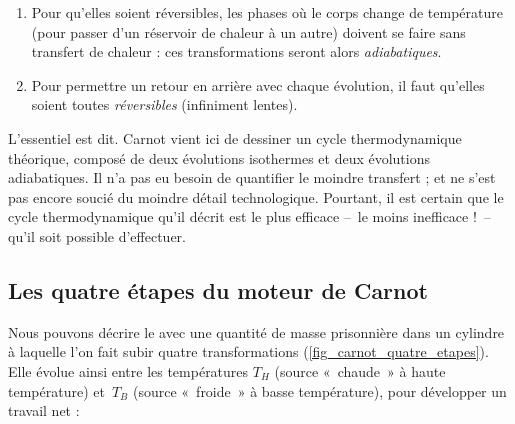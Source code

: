 		\begin{enumerate}%
			\item Pour qu’elles soient réversibles, les phases où le corps change de température (pour passer d’un réservoir de chaleur à un autre) doivent se faire sans transfert de chaleur : ces transformations seront alors \emph{adiabatiques}.
			\item Pour permettre un retour en arrière avec chaque évolution, il faut qu’elles soient toutes \emph{réversibles} (infiniment lentes).
		\end{enumerate}

		L’essentiel est dit. Carnot vient ici de dessiner un cycle thermodynamique théorique, composé de deux évolutions isothermes et deux évolutions adiabatiques. Il n’a pas eu besoin de quantifier le moindre transfert ; et ne s’est pas encore soucié du moindre détail technologique. Pourtant, il est certain que le cycle thermodynamique qu’il décrit est le plus efficace --\ le moins inefficace !\ -- qu’il soit possible d’effectuer.
		
	\onlyframabook{\clearpage}
	\subsection{Les quatre étapes du moteur de Carnot}
	\label{ch_descritpion_cycle_carnot}

		Nous pouvons décrire le  avec une quantité de masse prisonnière dans un cylindre à laquelle l’on fait subir quatre transformations (\cref{fig_carnot_quatre_etapes}). Elle évolue ainsi entre les températures $T_H$ (source «~chaude~» à haute température) et~$T_B$ (source «~froide~» à basse température), pour développer un travail net :

